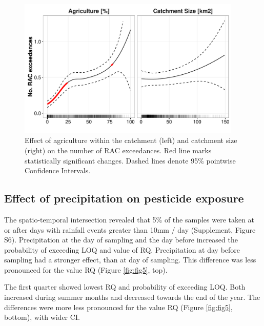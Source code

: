 \documentclass[journal=esthag,manuscript=article]{achemso}
\begin{document}
\begin{figure}[ht]
  \includegraphics[width=0.95\textwidth]{figure4.pdf}
  \caption{Effect of agriculture within the catchment (left) and catchment size (right) on the number of RAC exceedances. Red line marks statistically significant changes. Dashed lines denote 95\% pointwise Confidence Intervals.
  }
  \label{fig:fig4}
\end{figure}


\subsection{Effect of precipitation on pesticide exposure}
The spatio-temporal intersection revealed that 5\% of the samples were taken at or after days with rainfall events greater than 10mm / day (Supplement, Figure S6).
Precipitation at the day of sampling and the day before increased the probability of exceeding LOQ and value of RQ.
Precipitation at day before sampling had a stronger effect, than at day of sampling. 
This difference was less pronounced for the value RQ (Figure \ref{fig:fig5}, top).

The first quarter showed lowest RQ and probability of exceeding LOQ.
Both increased during summer months and decreased towards the end of the year.
The differences were more less pronounced for the value RQ (Figure \ref{fig:fig5}, bottom), with wider CI.
\end{document}
